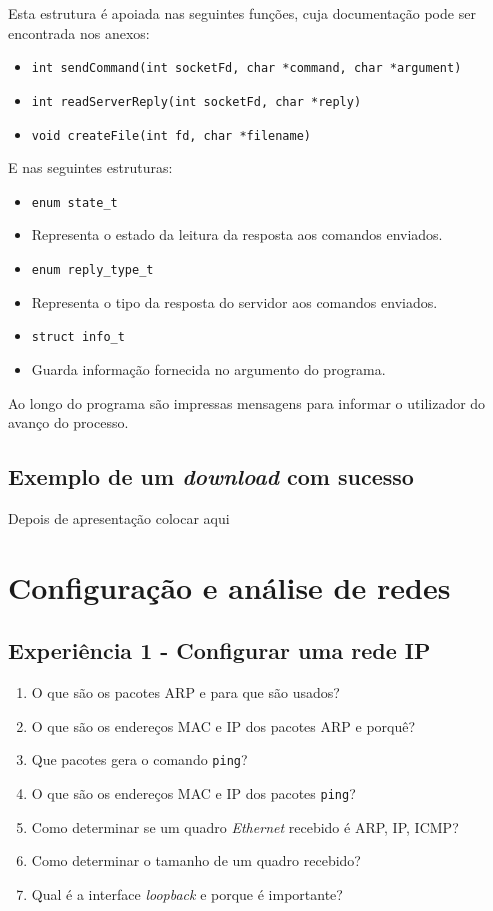 \documentclass{article}
\begin{document}
Esta estrutura é apoiada nas seguintes funções, cuja documentação pode ser encontrada nos anexos:
\begin{itemize}
\item \texttt{int sendCommand(int socketFd, char *command, char *argument)}
\item \texttt{int readServerReply(int socketFd, char *reply)}
\item \texttt{void createFile(int fd, char *filename)}
\end{itemize}

E nas seguintes estruturas:

\begin{itemize}
\item \texttt{enum state_t}
\item[] Representa o estado da leitura da resposta aos comandos enviados.
\item \texttt{enum reply_type_t}
\item[] Representa o tipo da resposta do servidor aos comandos enviados. 
\item \texttt{struct info_t}
\item[] Guarda informação fornecida no argumento do programa. 
\end{itemize}


Ao longo do programa são impressas mensagens para informar o utilizador do avanço do processo.
\subsection{Exemplo de um \textit{download} com sucesso}
Depois de apresentação colocar aqui
\section{Configuração e análise de redes}
\subsection{Experiência 1 - Configurar uma rede IP}
\begin{enumerate}
\item O que são os pacotes ARP e para que são usados?

\item O que são os endereços MAC e IP dos pacotes ARP e porquê?

\item Que pacotes gera o comando \texttt{ping}?

\item O que são os endereços MAC e IP dos pacotes \texttt{ping}?

\item Como determinar se um quadro \textit{Ethernet} recebido é ARP, IP, ICMP?

\item Como determinar o tamanho de um quadro recebido?

\item Qual é a interface \textit{loopback} e porque é importante?
\end{enumerate}
\end{document}
